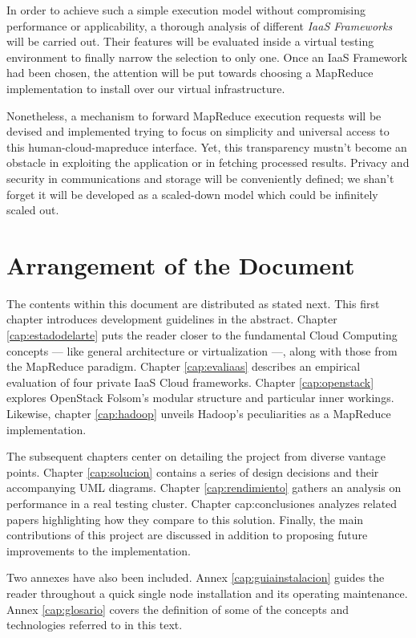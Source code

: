 In order to achieve such a simple execution model without compromising performance or applicability, a thorough analysis of different \emph{IaaS Frameworks} will be carried out. Their features will be evaluated inside a virtual testing environment to finally narrow the selection to only one. Once an IaaS Framework had been chosen, the attention will be put towards choosing a MapReduce implementation to install over our virtual infrastructure.

Nonetheless, a mechanism to forward MapReduce execution requests will be devised and implemented trying to focus on simplicity and universal access to this human-cloud-mapreduce interface. Yet, this transparency mustn't become an obstacle in exploiting the application or in fetching processed results. Privacy and security in communications and storage will be conveniently defined; we shan't forget it will be developed as a scaled-down model which could be infinitely scaled out.

\section{Arrangement of the Document}\label{sec:organizacion}
\noindent The contents within this document are distributed as stated next. This first chapter introduces development guidelines in the abstract. Chapter \ref{cap:estadodelarte} puts the reader closer to the fundamental Cloud Computing concepts --- like general architecture or virtualization ---, along with those from the MapReduce paradigm. Chapter \ref{cap:evaliaas} describes an empirical evaluation of four private IaaS Cloud frameworks. Chapter \ref{cap:openstack} explores OpenStack Folsom's modular structure and particular inner workings. Likewise, chapter \ref{cap:hadoop} unveils Hadoop's peculiarities as a MapReduce implementation.

The subsequent chapters center on detailing the project from diverse vantage points. Chapter \ref{cap:solucion} contains a series of design decisions and their accompanying UML diagrams. Chapter \ref{cap:rendimiento} gathers an analysis on performance in a real testing cluster. Chapter {cap:conclusiones} analyzes related papers highlighting how they compare to this solution. Finally, the main contributions of this project are discussed in addition to proposing future improvements to the implementation.

Two annexes have also been included. Annex \ref{cap:guiainstalacion} guides the reader throughout a quick single node installation and its operating maintenance. Annex \ref{cap:glosario} covers the definition of some of the concepts and technologies referred to in this text.
